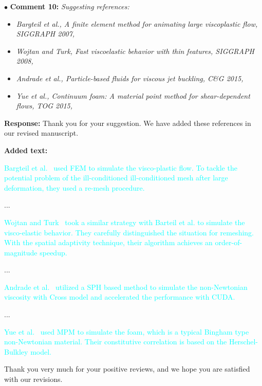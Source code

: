 \documentclass[12pt,a4paper]{article}
\newcommand{\revised}[1]{\textcolor{cyan}{#1}}
\begin{document}
\vspace{0.4cm}
\noindent$\bullet$ \enspace \textbf{Comment 10:}
\textit{Suggesting references:}
\begin{itemize}

	\item \textit{Bargteil et al., A finite element method for animating large viscoplastic flow, SIGGRAPH 2007,}

	\item \textit{Wojtan and Turk, Fast viscoelastic behavior with thin features, SIGGRAPH 2008,}

	\item \textit{Andrade et al., Particle-based fluids for viscous jet buckling, C\&G 2015,}

	\item \textit{Yue et al., Continuum foam: A material point method for shear-dependent flows, TOG 2015,}

\end{itemize}



\vspace{0.2cm}
\textbf{Response:}
Thank you for your suggestion. We have added these references in our revised manuscript.


\vspace{0.2cm}
\textbf{Added text:}

\revised{Bargteil et al.~\cite{Bargteil-2007-AFE} used FEM to simulate the visco-plastic flow. To tackle the potential problem of the ill-conditioned ill-conditioned mesh after large deformation, they used a re-mesh procedure.}

...

\revised{Wojtan and Turk~\cite{Wojtan2008} took a similar strategy with Barteil et al. to simulate the visco-elastic behavior. They carefully distinguished the situation for remeshing. With the spatial adaptivity technique, their algorithm achieves an order-of-magnitude speedup.}

...

\revised{Andrade et al.~\cite{Andrade2015} utilized a SPH based method to simulate the non-Newtonian viscosity with Cross model and accelerated the performance with CUDA.}

...

\revised{Yue et al.~\cite{Yue2015} used MPM to simulate the foam, which is a typical Bingham type non-Newtonian material. Their constitutive correlation is based on the Herschel-Bulkley model. }


Thank you very much for your positive reviews, and we hope you are satisfied with our
revisions.
\end{document}
